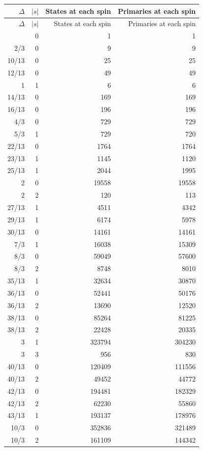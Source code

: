 \begingroup\footnotesize
\setlength{\tabcolsep}{5pt}
\begin{longtable}{@{}rrrr@{}}
\toprule
$\Delta$ & $|s|$ & States at each spin & Primaries at each spin\\
\midrule\endfirsthead
\toprule
$\Delta$ & $|s|$ & States at each spin & Primaries at each spin\\
\midrule\endhead
\bottomrule\endfoot
0 & 0 & 1 & 1\\
2/3 & 0 & 9 & 9\\
10/13 & 0 & 25 & 25\\
12/13 & 0 & 49 & 49\\
1 & 1 & 6 & 6\\
14/13 & 0 & 169 & 169\\
16/13 & 0 & 196 & 196\\
4/3 & 0 & 729 & 729\\
5/3 & 1 & 729 & 720\\
22/13 & 0 & 1764 & 1764\\
23/13 & 1 & 1145 & 1120\\
25/13 & 1 & 2044 & 1995\\
2 & 0 & 19558 & 19558\\
2 & 2 & 120 & 113\\
27/13 & 1 & 4511 & 4342\\
29/13 & 1 & 6174 & 5978\\
30/13 & 0 & 14161 & 14161\\
7/3 & 1 & 16038 & 15309\\
8/3 & 0 & 59049 & 57600\\
8/3 & 2 & 8748 & 8010\\
35/13 & 1 & 32634 & 30870\\
36/13 & 0 & 52441 & 50176\\
36/13 & 2 & 13690 & 12520\\
38/13 & 0 & 85264 & 81225\\
38/13 & 2 & 22428 & 20335\\
3 & 1 & 323794 & 304230\\
3 & 3 & 956 & 830\\
40/13 & 0 & 120409 & 111556\\
40/13 & 2 & 49452 & 44772\\
42/13 & 0 & 194481 & 182329\\
42/13 & 2 & 62230 & 55860\\
43/13 & 1 & 193137 & 178976\\
10/3 & 0 & 352836 & 321489\\
10/3 & 2 & 161109 & 144342\\

\end{longtable}
